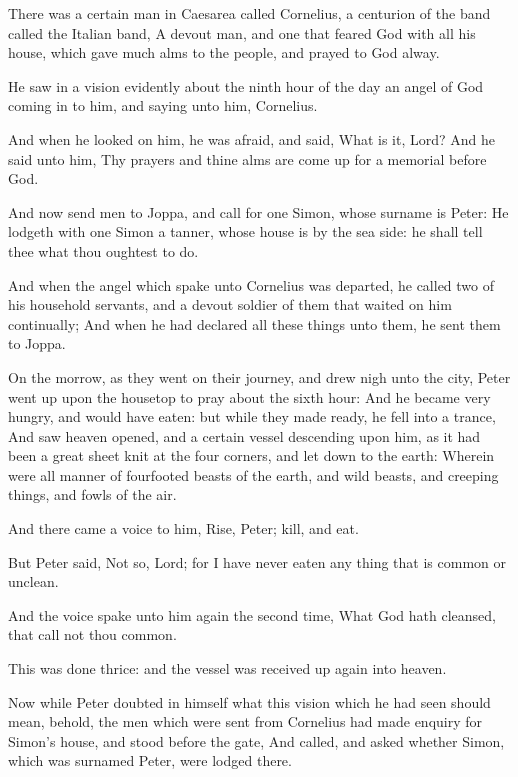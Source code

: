 \Chapter
\Verse There was a certain man in Caesarea called Cornelius, a centurion of the band called the Italian band, \Verse A devout man, and one that feared God with all his house, which gave much alms to the people, and prayed to God alway.

\Verse He saw in a vision evidently about the ninth hour of the day an angel of God coming in to him, and saying unto him, Cornelius.

\Verse And when he looked on him, he was afraid, and said, What is it, Lord?  And he said unto him, Thy prayers and thine alms are come up for a memorial before God.

\Verse And now send men to Joppa, and call for one Simon, whose surname is Peter: \Verse He lodgeth with one Simon a tanner, whose house is by the sea side: he shall tell thee what thou oughtest to do.

\Verse And when the angel which spake unto Cornelius was departed, he called two of his household servants, and a devout soldier of them that waited on him continually; \Verse And when he had declared all these things unto them, he sent them to Joppa.

\Verse On the morrow, as they went on their journey, and drew nigh unto the city, Peter went up upon the housetop to pray about the sixth hour: \Verse And he became very hungry, and would have eaten: but while they made ready, he fell into a trance, \Verse And saw heaven opened, and a certain vessel descending upon him, as it had been a great sheet knit at the four corners, and let down to the earth: \Verse Wherein were all manner of fourfooted beasts of the earth, and wild beasts, and creeping things, and fowls of the air.

\Verse And there came a voice to him, Rise, Peter; kill, and eat.

\Verse But Peter said, Not so, Lord; for I have never eaten any thing that is common or unclean.

\Verse And the voice spake unto him again the second time, What God hath cleansed, that call not thou common.

\Verse This was done thrice: and the vessel was received up again into heaven.

\Verse Now while Peter doubted in himself what this vision which he had seen should mean, behold, the men which were sent from Cornelius had made enquiry for Simon's house, and stood before the gate, \Verse And called, and asked whether Simon, which was surnamed Peter, were lodged there.


